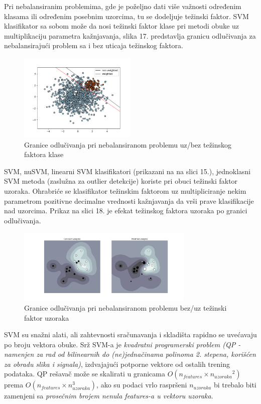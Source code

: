 \documentclass[fontsize=12bp, paper=a4]{scrarticle}
\begin{document}
Pri nebalansiranim problemima, gde je poželjno dati više važnosti određenim klasama ili određenim posebnim uzorcima, tu se dodeljuje težinski faktor.
SVM klasifikator sa sobom može da nosi težinski faktor klase pri metodi obuke uz multiplikaciju parametra kažnjavanja, slika 17. predstavlja granicu odlučivanja za nebalansirajući problem sa i bez uticaja težinskog faktora.  

\begin{figure}[h!]
    \centering
    \includegraphics[width=0.5\textwidth]{image-15.png}
    \caption{Granice odlučivanja pri nebalansiranom problemu uz/bez težinskog faktora klase}
\end{figure}

SVM, nuSVM, linearni SVM klasifikatori (prikazani na na slici 15.), jednoklasni SVM metoda (zaslužna za outlier detekcije) koriste pri obuci težinski faktor uzoraka. Ohrabriće se klasifikator težinskim faktorom uz multipliciranje nekim parametrom pozitivne decimalne vrednosti kažnjavanja  da vrši prave klasifikacije nad uzorcima. Prikaz na slici 18. je efekat težinskog faktora uzoraka po granici odlučivanja.

\begin{figure}[h!]
    \centering
    \includegraphics[width=0.75\textwidth]{image-16.png}
    \caption{Granice odlučivanja pri nebalansiranom problemu bez/uz težinski faktor uzoraka}
\end{figure}

SVM su snažni alati, ali zahtevnosti sračunavanja i skladišta rapidno se uvećavaju po broju vektora obuke. Srž SVM-a je \textit{kvadratni programerski problem (QP - namenjen za rad od bilinearnih do (ne)jednačinama polinoma 2. stepena, korišćen za obradu slika i signala)}\cite{qp}, izdvajajući potporne vektore od ostalih trening podataka. QP rešavač može se skalirati u granicama $O(n_{features} \times {n_{uzoraka}}^2)$ prema $O(n_{features} \times n_{uzoraka}^3)$, ako su podaci vrlo raspršeni $n_{uzoraka}$ bi trebalo biti zamenjeni sa \textit{prosečnim brojem nenula features-a u vektoru uzoraka}.
\end{document}
